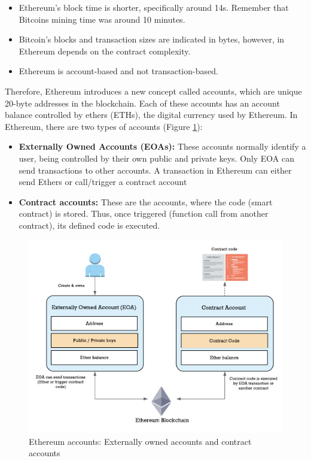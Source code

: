 \begin{itemize}
	
	\item Ethereum's block time is shorter, specifically around 14s. Remember that Bitcoins mining time was around 10 minutes.
	\item Bitcoin's blocks and transaction sizes are indicated in bytes, however, in Ethereum depends on the contract complexity. 
	\item Ethereum is account-based and not transaction-based.
\end{itemize}

Therefore, Ethereum introduces a new concept called accounts, which are unique 20-byte addresses in the blockchain. Each of these accounts has an account balance controlled by ethers (ETHs), the digital currency used by Ethereum. In Ethereum, there are two types of accounts (Figure \ref{fig:EthereumAccounts}):

\begin{itemize}
	
	\item \textbf{Externally Owned Accounts (EOAs):} These accounts normally identify a user, being controlled by their own public and private keys. Only EOA can send transactions to other accounts. A transaction in Ethereum can either send Ethers or call/trigger a contract account  
	\item \textbf{Contract accounts:} These are the accounts, where the code (smart contract) is stored. Thus, once triggered (function call from another contract), its defined code is executed.
\end{itemize}

\begin{figure}[bth]
  \centering
  \includegraphics[scale=0.8]{gfx/ethereumAccounts}    
  \caption{Ethereum accounts: Externally owned accounts and contract 			accounts}
  \label{fig:EthereumAccounts}
\end{figure}

